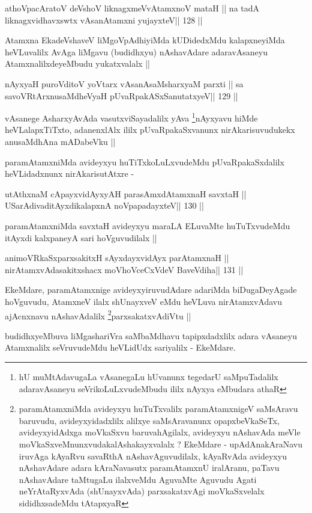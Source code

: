 \begin{shl}
athoVpacAratoV deVshoV liknagxmeVvA\s\s tamxnoV mataH ||
na tadA liknagxvidhavxswtx vAsanA\s\s tamxni yujayxteV\hfill || 128 ||
\end{shl}

\begin{artha}
Atamxna EkadeVshaveV liMgoVpAdhiyiMda kUDidedxMdu kalapxneyiMda
heVLuvalilx AvAga liMgavu (budidhxyu) nAshavAdare adaravAsaneyu
AtamxnalilxdeyeMbudu yukatxvalalx ||
\end{artha}

\begin{shl}
nAyxyaH puroVditoV yoV\s tarx vAsanAsaMsharxyaM parxti ||
sa savoVR\s tArxnusaMdheVyaH pUvaRpakASxSanutatxyeV\hfill || 129 ||
\end{shl}

\begin{artha}
vAsanege AsharxyAvAda vasutxviSayadalilx yAva \footnote[1]{hU
  muMtAdavugaLa vAsanegaLu hUvanunx tegedarU saMpuTadalilx
  adaravAsaneyu seVrikoLuLxvudeMbudu ililx nAyxya eMbudara athaR}nAyxyavu
hiMde heVLalapxTiTxto, adanenxlAlx ililx pUvaRpakaSxvanunx
nirAkarisuvudukekx anusaMdhAna mADabeVku ||
\end{artha}

\begin{artha}
paramAtamxniMda avideyxyu huTiTxkoLuLxvudeMdu pUvaRpakaSxdalilx
heVLidadxnunx nirAkarisutAtxre -
\end{artha}

\begin{shl}
utAthxnaM cApayxvidAyxyAH parasAmxdAtamxnaH savxtaH ||
USarAdivaditAyxdikalapxnA noVpapadayxteV\hfill || 130 ||
\end{shl}

\begin{artha}
paramAtamxniMda savxtaH avideyxyu maraLA ELuvaMte huTuTxvudeMdu
itAyxdi kalxpaneyA sari hoVguvudilalx ||
\end{artha}

\begin{shl}
animoVRkaSxparxsakitxH sAyxdayxvidAyx parAtamxnaH ||
nirAtamxvAdasakitxshacx moVhoVceCxVdeV BaveVdiha\hfill || 131 ||
\end{shl}

\begin{artha}
EkeMdare, paramAtamxnige avideyxyiruvudAdare adariMda biDugaDeyAgade
hoVguvudu, AtamxneV ilalx shUnayxveV eMdu heVLuva nirAtamxvAdavu
ajAcnxnavu nAshavAdalilx \footnote[1]{paramAtamxniMda avideyxyu
  huTuTxvalilx paramAtamxnigeV saMsAravu baruvudu, avideyxyidadxlilx
  alilxye saMsAravanunx opapxbeVkaSeTx, avideyxyidAdxga moVkaSxvu
  baruvahAgilalx, avideyxyu nAshavAda meVle
  moVkaSxveMnunxvudakalAshakayxvalalx ? EkeMdare - upAdAnakAraNavu
  iruvAga kAyaRvu savaRthA nAshavAguvudilalx, kAyaRvAda avideyxyu
  nAshavAdare adara kAraNavasutx paramAtamxnU iralAranu, paTavu
  nAshavAdare taMtugaLu ilalxveMdu AguvaMte Aguvudu Agati
  neYrAtaRyxvAda (shUnayxvAda) parxsakatxvAgi moVkaSxvelalx
  sididhxsadeMdu tAtapxyaR}parxsakatxvAdiVtu ||

budidhxyeMbuva liMgashariVra saMbaMdhavu tapipxdadxlilx adara vAsaneyu
Atamxnalilx seVruvudeMdu heVLidUdx sariyalilx - EkeMdare.
\end{artha}

